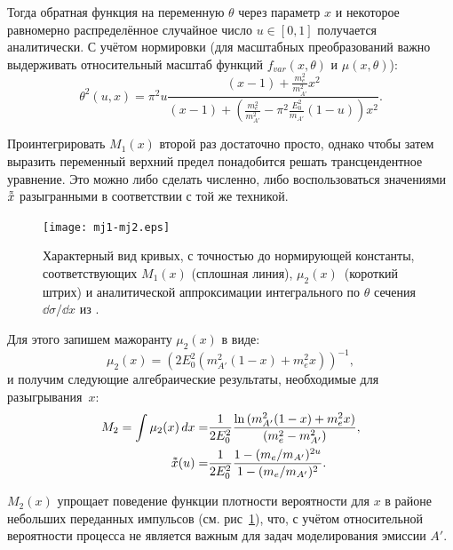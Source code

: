 Тогда обратная функция на переменную $\theta$ через параметр $x$ и некоторое
равномерно распределённое случайное число $u \in [0, 1]$ получается
аналитически. С учётом нормировки
(для масштабных преобразований важно выдерживать относительный масштаб функций
$f_{var}(x, \theta)$ и $\mu(x, \theta)$):
\begin{equation}
    \theta^2 (u, x) = \pi^2 u \frac{ (x-1) + \frac{m_{e}^2}{m_{A'}^2} x^2 }
              { (x-1) + (\frac{m_{e}^2}{m_{A'}^2} - \pi^2 \frac{E_0^2}{m_{A'}} (1-u)) x^2 }.
    \label{eq:thetaExpr}
\end{equation}

Проинтегрировать
$M_1(x)$
второй раз достаточно просто, однако
чтобы затем выразить переменный верхний предел понадобится решать
трансцендентное уравнение. Это можно либо сделать численно, либо
воспользоваться значениями $\vardbtilde{x}$ разыгранными в соответствии с той
же техникой.

\begin{figure}
    \centering
    \texttt{[image: mj1-mj2.eps]}
    \caption{ Характерный вид кривых, с точностью до нормирующей константы,
    соответствующих $M_1(x)$ (сплошная линия),
    $\mu_2(x)$~(короткий штрих)
    и аналитической аппроксимации интегрального по $\theta$ сечения
    $\dd{\sigma}/\dd{x}$ из \cite{bjorken}.}
    \label{fig:mj1mj2}
\end{figure}

Для этого запишем мажоранту $\mu_2(x)$ в виде:
\begin{equation}
    \mu_2(x) = ( 2 E_0^2 (m_{A'}^2 (1 - x) + m_e^2 x ) )^{-1},
\end{equation}
и получим следующие алгебраические результаты, необходимые для
разыгрывания~$x$:
\begin{align}
    M_2 = \int \mu_2(x) \dd{x} =& \frac{1}{2 E_0^2} \frac{\ln{( m_{A'}^2 (1 - x) + m_e^2 x )}}{(m_e^2 - m_{A'}^2)}, \\
    \vardbtilde{x}(u) =& \frac{1}{2 E_0^2} \frac{1-(m_e/m_{A'})^{2 u}}{1-(m_e/m_{A'})^{2}}.
    \label{eq:mj2x}
\end{align}

$M_2(x)$ упрощает поведение функции плотности вероятности
для $x$ в районе небольших переданных импульсов (см.
рис~\ref{fig:mj1mj2}), что, с учётом
относительной вероятности процесса не является важным для задач моделирования
эмиссии $A'$.

